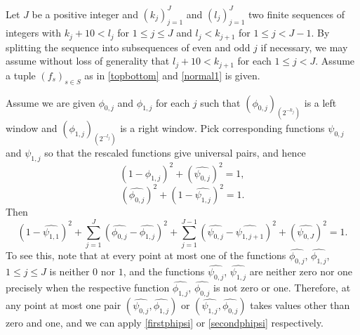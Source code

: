 \documentclass[12pt,reqno]{amsart}
\theoremstyle{plain}
\theoremstyle{definition}
\numberwithin{equation}{section}
\begin{document}
 
Let $J$ be a positive integer and   $(k_j)_{j=1}^J$ and $(l_j)_{j=1}^J$   two finite sequences of integers with $k_{j}+10< l_j$ for $1\le j\le J$ and
$l_j< k_{j+1}$ for $1\le j<J-1$. By splitting the sequence into 
subsequences of even and odd $j$ if necessary, we may assume without loss of generality that $l_j+10<k_{j+1}$ for each $1\le j<J$.
 Assume a tuple 
 $(f_s)_{s\in S}$ as in \eqref{topbottom} and \eqref{normal1} is given.
 

Assume we are given $\phi_{0,j}$ and $\phi_{1,j}$ for each $j$ such that ${(\phi_{0,j})_{(2^{-k_j})}}$
is a left window and ${(\phi_{1,j})_{(2^{-l_j})}}$
is a right window.
Pick corresponding functions   
$\psi_{0,j}$ and $\psi_{1,j}$ so that the rescaled functions give universal pairs, and hence 
\begin{equation}\label{firstphipsi}
(1-\widehat{{\phi}_{1,j}})^2+(\widehat{{\psi}_{0,j}})^2=1,
\end{equation}
\begin{equation}\label{secondphipsi}
(\widehat{{\phi}_{0,j}})^2+(1-\widehat{{\psi}_{1,j}})^2=1.
\end{equation}
Then
\begin{equation}\label{diagsumone}
(1-\widehat{\psi_{1,1}})^2+\sum_{j=1}^J (\widehat{\phi_{0,j}}-\widehat{\phi_{1,j}})^2+ \sum_{j=1}^{J-1} (\widehat{\psi_{0,j}}-\widehat{\psi_{1,j+1}})^2+(\widehat{\psi_{0,J}})^2
=1.
\end{equation}
 To see this, note that at every point  at most one of
the functions $\widehat{{\phi}_{0,j}}$, $\widehat{{\phi}_{1,j}}$, $1\le j\le J$
is neither $0$ nor $1$, and the functions $\widehat{{\psi}_{0,j}}$, $\widehat{{\psi}_{1,j}}$
are neither zero nor one precisely when the respective function $\widehat{{\phi}_{1,j}}$,  $\widehat{{\phi}_{0,j}}$ is not zero or one. Therefore, at any point at most one pair
$(\widehat{{\psi}_{0,j}}, \widehat{{\phi}_{1,j}})$ or $(\widehat{{\psi}_{1,j}}, \widehat{{\phi}_{0,j}})$ takes values other than zero and one, and we can apply 
\eqref{firstphipsi} or \eqref{secondphipsi} respectively.
\end{document}
